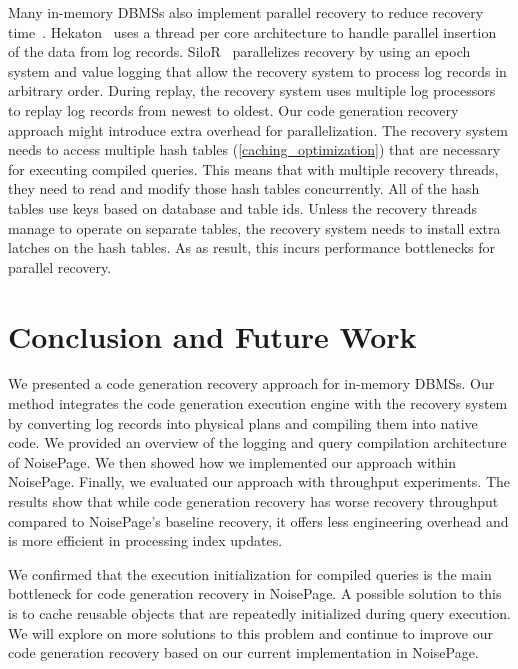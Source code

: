 \documentclass[12pt]{cmuthesis}
\begin{document}
Many in-memory DBMSs also implement parallel recovery to reduce recovery time~\cite{faeber17}. Hekaton~\cite{hekaton2013} uses a thread per core architecture to handle parallel insertion of the data from log records. SiloR~\cite{silo_r} parallelizes recovery by using an epoch system and value logging that allow the recovery system to process log records in arbitrary order. During replay, the recovery system uses multiple log processors to replay log records from newest to oldest. Our code generation recovery approach might introduce extra overhead for parallelization. The recovery system needs to access multiple hash tables (\cref{caching_optimization}) that are necessary for executing compiled queries. This means that with multiple recovery threads, they need to read and modify those hash tables concurrently. All of the hash tables use keys based on database and table ids. Unless the recovery threads manage to operate on separate tables, the recovery system needs to install extra latches on the hash tables. As as result, this incurs performance bottlenecks for parallel recovery.

\chapter{Conclusion and Future Work}
We presented a code generation recovery approach for in-memory DBMSs. Our method integrates the code generation execution engine with the recovery system by converting log records into physical plans and compiling them into native code. We provided an overview of the logging and query compilation architecture of NoisePage. We then showed how we implemented our approach within NoisePage. Finally, we evaluated our approach with throughput experiments. The results show that while code generation recovery has worse recovery throughput compared to NoisePage's baseline recovery, it offers less engineering overhead and is more efficient in processing index updates.

We confirmed that the execution initialization for compiled queries is the main bottleneck for code generation recovery in NoisePage. A possible solution to this is to cache reusable objects that are repeatedly initialized during query execution. We will explore on more solutions to this problem and continue to improve our code generation recovery based on our current implementation in NoisePage. 

%

\backmatter


\renewcommand{\bibsection}{\chapter{\bibname}}

\end{document}
